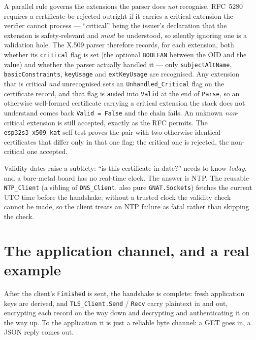 A parallel rule governs the extensions the parser does \emph{not} recognise.
RFC~5280 requires a certificate be rejected outright if it carries a critical
extension the verifier cannot process --- ``critical'' being the issuer's
declaration that the extension is safety-relevant and \emph{must} be understood, so
silently ignoring one is a validation hole. The X.509 parser therefore records, for
each extension, both whether its \texttt{critical} flag is set (the optional
\texttt{BOOLEAN} between the OID and the value) and whether the parser actually
handled it --- only \texttt{subjectAltName}, \texttt{basicConstraints},
\texttt{keyUsage} and \texttt{extKeyUsage} are recognised. Any extension that is
critical \emph{and} unrecognised sets an \texttt{Unhandled\_Critical} flag on the
certificate record, and that flag is \texttt{and}ed into \texttt{Valid} at the end
of \texttt{Parse}, so an otherwise well-formed certificate carrying a critical
extension the stack does not understand comes back \texttt{Valid = False} and the
chain fails. An unknown \emph{non}-critical extension is still accepted, exactly as
the RFC permits. The \texttt{esp32s3\_x509\_kat} self-test proves the pair with two
otherwise-identical certificates that differ only in that one flag: the critical one
is rejected, the non-critical one accepted.

Validity dates raise a subtlety: ``is this certificate in date?'' needs to know
\emph{today}, and a bare-metal board has no real-time clock. The answer is NTP.
The reusable \texttt{NTP\_Client} (a sibling of \texttt{DNS\_Client}, also pure
\texttt{GNAT.Sockets}) fetches the current UTC time before the handshake; without a
trusted clock the validity check cannot be made, so the client treats an NTP
failure as fatal rather than skipping the check.

\section{The application channel, and a real example}
\label{ch:tls:app}

After the client's \texttt{Finished} is sent, the handshake is complete: fresh
application keys are derived, and \texttt{TLS\_Client.Send} / \texttt{Recv} carry
plaintext in and out, encrypting each record on the way down and decrypting and
authenticating it on the way up. To the application it is just a reliable byte
channel: a GET goes in, a JSON reply comes out.

